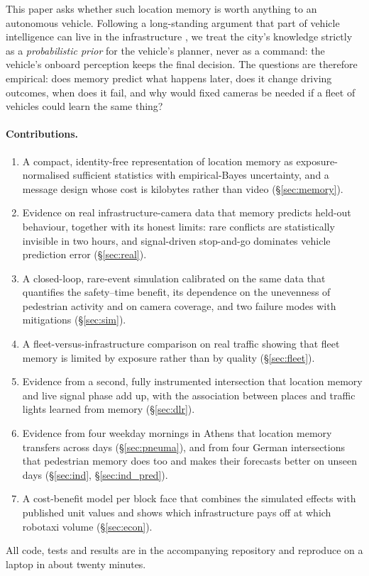 \documentclass[11pt,a4paper]{article}
\begin{document}
This paper asks whether such location memory is worth anything to an autonomous vehicle.
Following a long-standing argument that part of vehicle intelligence can live in the infrastructure \citep{gopalswamy2018iea}, we treat the city's knowledge strictly as a \emph{probabilistic prior} for the vehicle's planner, never as a command: the vehicle's onboard perception keeps the final decision.
The questions are therefore empirical: does memory predict what happens later, does it change driving outcomes, when does it fail, and why would fixed cameras be needed if a fleet of vehicles could learn the same thing?

\paragraph{Contributions.}
\begin{enumerate}
\item A compact, identity-free representation of location memory as exposure-normalised sufficient statistics with empirical-Bayes uncertainty, and a message design whose cost is kilobytes rather than video (\S\ref{sec:memory}).
\item Evidence on real infrastructure-camera data that memory predicts held-out behaviour, together with its honest limits: rare conflicts are statistically invisible in two hours, and signal-driven stop-and-go dominates vehicle prediction error (\S\ref{sec:real}).
\item A closed-loop, rare-event simulation calibrated on the same data that quantifies the safety--time benefit, its dependence on the unevenness of pedestrian activity and on camera coverage, and two failure modes with mitigations (\S\ref{sec:sim}).
\item A fleet-versus-infrastructure comparison on real traffic showing that fleet memory is limited by exposure rather than by quality (\S\ref{sec:fleet}).
\item Evidence from a second, fully instrumented intersection that location memory and live signal phase add up, with the association between places and traffic lights learned from memory (\S\ref{sec:dlr}).
\item Evidence from four weekday mornings in Athens that location memory transfers across days (\S\ref{sec:pneuma}), and from four German intersections that pedestrian memory does too and makes their forecasts better on unseen days (\S\ref{sec:ind}, \S\ref{sec:ind_pred}).
\item A cost-benefit model per block face that combines the simulated effects with published unit values and shows which infrastructure pays off at which robotaxi volume (\S\ref{sec:econ}).
\end{enumerate}
All code, tests and results are in the accompanying repository and reproduce on a laptop in about twenty minutes.
\end{document}
